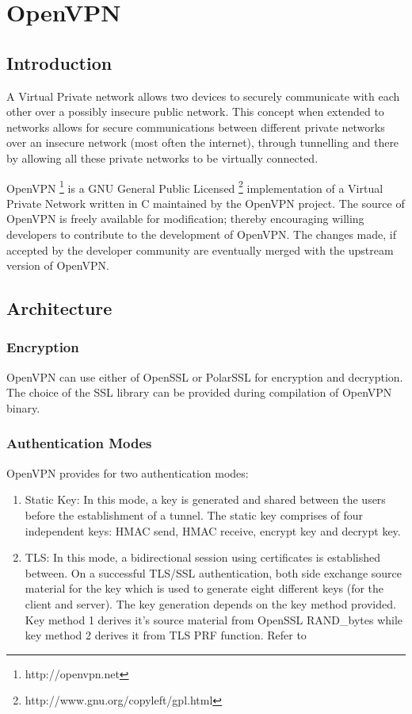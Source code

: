 \documentclass[11pt,oneside]{book}
\newcommand{\mychapter}[2]{
    \setcounter{chapter}{#1}
    \setcounter{section}{0}
    \chapter*{#2}
    \addcontentsline{toc}{chapter}{#2}
}
\begin{document}
\printglossary
{}

\mainmatter

\mychapter{1}{OpenVPN}
\section{Introduction}
A Virtual Private network allows two devices to securely communicate with each other
over a possibly insecure public network. This concept when extended to networks
allows for secure communications between different private networks over an
insecure network (most often the internet), through tunnelling and there by allowing
all these private networks to be virtually connected.

OpenVPN \footnote{http://openvpn.net} is a GNU General Public
Licensed \footnote{http://www.gnu.org/copyleft/gpl.html} implementation of a
Virtual Private Network written in C maintained by the OpenVPN project.
The source of OpenVPN is freely available for modification; thereby encouraging willing
developers to contribute to the development of OpenVPN. The changes made, if accepted
by the developer community are eventually merged with the upstream version of OpenVPN.

\section{Architecture}
\subsection{Encryption}
OpenVPN can use either of OpenSSL or PolarSSL for encryption and decryption. The choice of the SSL
library can be provided during compilation of OpenVPN binary.

\subsection{Authentication Modes}
OpenVPN provides for two authentication modes:

\begin{enumerate}
    \item {Static Key}: In this mode, a key is generated and shared between the users before
        the establishment of a tunnel. The static key comprises of four independent keys: HMAC send,
        HMAC receive, encrypt key and decrypt key.
    \item {TLS}: In this mode, a bidirectional session using certificates is established between.
        On a successful TLS/SSL authentication, both side exchange source material for the key
        which is used to generate eight different keys (for the client and server). The key
        generation depends on the key method provided. Key method 1 derives it's source material
        from OpenSSL RAND\_bytes while key method 2 derives it from TLS PRF\cite{RFC5246} function.
        Refer to \
\end{enumerate}
\end{document}
